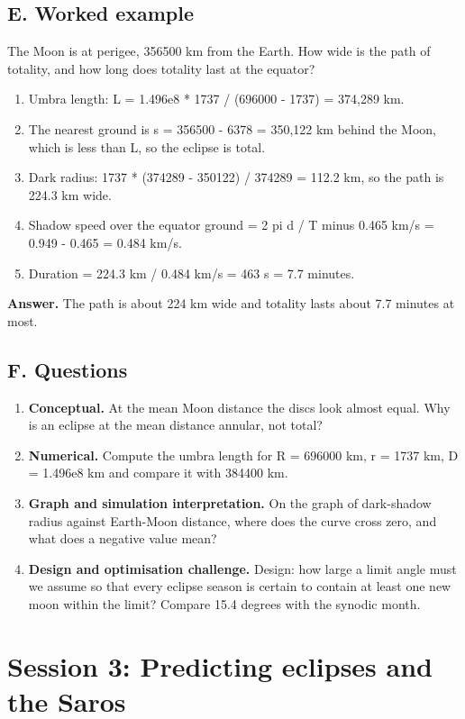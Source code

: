 \documentclass[11pt,a4paper]{article}
\begin{document}
\subsection*{E. Worked example}
The Moon is at perigee, 356500 km from the Earth. How wide is the path of totality, and how long does totality last at the equator?
\begin{enumerate}[nosep]
\item Umbra length: L = 1.496e8 * 1737 / (696000 - 1737) = 374,289 km.
\item The nearest ground is s = 356500 - 6378 = 350,122 km behind the Moon, which is less than L, so the eclipse is total.
\item Dark radius: 1737 * (374289 - 350122) / 374289 = 112.2 km, so the path is 224.3 km wide.
\item Shadow speed over the equator ground = 2 pi d / T minus 0.465 km/s = 0.949 - 0.465 = 0.484 km/s.
\item Duration = 224.3 km / 0.484 km/s = 463 s = 7.7 minutes.
\end{enumerate}
\textbf{Answer.} The path is about 224 km wide and totality lasts about 7.7 minutes at most.

\subsection*{F. Questions}
\begin{enumerate}[nosep]
\item \textbf{Conceptual.} At the mean Moon distance the discs look almost equal. Why is an eclipse at the mean distance annular, not total?
\item \textbf{Numerical.} Compute the umbra length for R = 696000 km, r = 1737 km, D = 1.496e8 km and compare it with 384400 km.
\item \textbf{Graph and simulation interpretation.} On the graph of dark-shadow radius against Earth-Moon distance, where does the curve cross zero, and what does a negative value mean?
\item \textbf{Design and optimisation challenge.} Design: how large a limit angle must we assume so that every eclipse season is certain to contain at least one new moon within the limit? Compare 15.4 degrees with the synodic month.
\end{enumerate}

\section{Session 3: Predicting eclipses and the Saros}
\end{document}
